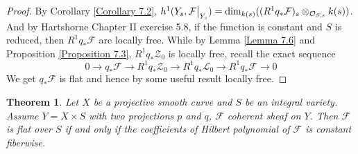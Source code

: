 \documentclass{ctexart}
\newtheorem{theorem}{Theorem}[section]
\begin{document}
\begin{proof}
    By Corollary \ref{Corollary 7.2}, $h^{1}(Y_{s}, \mathcal{F}\big{|}_{Y_{s}}) = \dim_{k(s)} ((R^{1}q_{\ast}\mathcal{F})_{s} \otimes_{\mathcal{O}_{S, s}} k(s))$.
    And by Hartshorne Chapter II exercise 5.8, if the function is constant and $S$ is reduced,
    then $R^{1}q_{\ast}\mathcal{F}$ are locally free.
    While by Lemma \ref{Lemma 7.6} and Proposition \ref{Proposition 7.3}, $R^{1}q_{\ast}\mathcal{Z}_{0}$ is locally free,
    recall the exact sequence
    \begin{equation}
        0 \longrightarrow q_{\ast}\mathcal{F} \longrightarrow R^{1}q_{\ast}\mathcal{Z}_{0} \longrightarrow R^{1}q_{\ast}\mathcal{L}_{0} \longrightarrow R^{1}q_{\ast}\mathcal{F} \longrightarrow 0
    \end{equation}
    We get $q_{\ast}\mathcal{F}$ is flat and hence by some useful result locally free.
\end{proof}
\begin{theorem}
    Let $X$ be a projective smooth curve and $S$ be an integral variety.
    Assume $Y = X \times S$ with two projections $p$ and $q$, $\mathcal{F}$ coherent sheaf on $Y$.
    Then $\mathcal{F}$ is flat over $S$ if and only if the coefficients of Hilbert polynomial of $\mathcal{F}$ is constant fiberwise.
    \label{Theorem 7.3}
\end{theorem}
\end{document}
